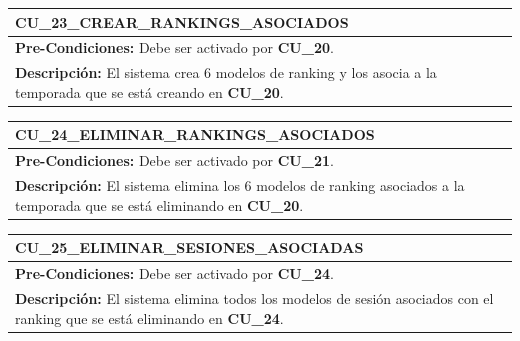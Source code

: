 \begin{center}
  \begin{tabular}{| p{7.5cm} | p{7.5cm} |}
    \hline
    \multicolumn{2}{|p{15cm}|}{\textbf{CU\_23\_CREAR\_RANKINGS\_ASOCIADOS}} \\ \hline
    \multicolumn{2}{|p{15cm}|}{\textbf{Pre-Condiciones:} Debe ser activado por \textbf{CU\_20}.} \\ \hline
    \multicolumn{2}{|p{15cm}|}{\textbf{Descripción:} El sistema crea 6 modelos de ranking y los asocia a la temporada que se está creando en \textbf{CU\_20}.} \\
    \hline
  \end{tabular}
  
  \label{table:usecase:23}
\end{center}

\begin{center}
  \begin{tabular}{| p{7.5cm} | p{7.5cm} |}
    \hline
    \multicolumn{2}{|p{15cm}|}{\textbf{CU\_24\_ELIMINAR\_RANKINGS\_ASOCIADOS}} \\ \hline
    \multicolumn{2}{|p{15cm}|}{\textbf{Pre-Condiciones:} Debe ser activado por \textbf{CU\_21}.} \\ \hline
    \multicolumn{2}{|p{15cm}|}{\textbf{Descripción:} El sistema elimina los 6 modelos de ranking asociados a la temporada que se está eliminando en \textbf{CU\_20}.} \\
    \hline
  \end{tabular}
  
  \label{table:usecase:24}
\end{center}

\begin{center}
  \begin{tabular}{| p{7.5cm} | p{7.5cm} |}
    \hline
    \multicolumn{2}{|p{15cm}|}{\textbf{CU\_25\_ELIMINAR\_SESIONES\_ASOCIADAS}} \\ \hline
    \multicolumn{2}{|p{15cm}|}{\textbf{Pre-Condiciones:} Debe ser activado por \textbf{CU\_24}.} \\ \hline
    \multicolumn{2}{|p{15cm}|}{\textbf{Descripción:} El sistema elimina todos los modelos de sesión asociados con el ranking que se está eliminando en \textbf{CU\_24}.} \\
    \hline
  \end{tabular}
  
  \label{table:usecase:25}
\end{center}

